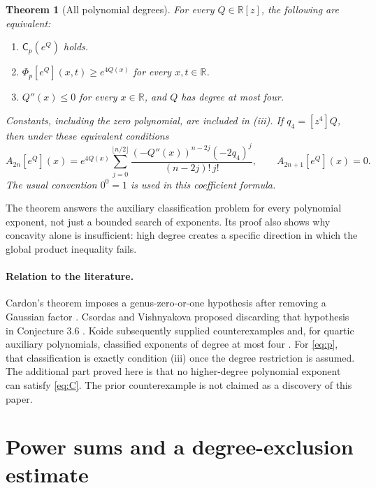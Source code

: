 \documentclass[11pt,a4paper]{article}
\newtheorem{theorem}{Theorem}[section]
\theoremstyle{remark}\newtheorem{remark}[theorem]{Remark}
\newcommand{\R}{\mathbb R}\newcommand{\C}{\mathbb C}
\newcommand{\Ph}{\Phi_p}
\begin{document}
\begin{theorem}[All polynomial degrees]\label{thm:main}
For every $Q\in\R[z]$, the following are equivalent:
\begin{enumerate}[label=\textup{(\roman*)},itemsep=3pt]
\item $\mathsf C_p(e^Q)$ holds.
\item $\Ph[e^Q](x,t)\ge e^{4Q(x)}$ for every $x,t\in\R$.
\item $Q''(x)\le0$ for every $x\in\R$, and $Q$ has degree at most four.
\end{enumerate}
Constants, including the zero polynomial, are included in \textup{(iii)}.
If $q_4=[z^4]Q$, then under these equivalent conditions
\begin{equation}\label{eq:coefficients}
 A_{2n}[e^Q](x)=e^{4Q(x)}
 \sum_{j=0}^{\lfloor n/2\rfloor}
 \frac{(-Q''(x))^{n-2j}(-2q_4)^j}{(n-2j)!\,j!},
 \qquad A_{2n+1}[e^Q](x)=0.
\end{equation}
The usual convention $0^0=1$ is used in this coefficient formula.
\end{theorem}

The theorem answers the auxiliary classification problem for every
polynomial exponent, not just a bounded search of exponents. Its proof
also shows why concavity alone is insufficient: high degree creates a
specific direction in which the global product inequality fails.

\paragraph{Relation to the literature.}
Cardon's theorem imposes a genus-zero-or-one hypothesis after removing
a Gaussian factor \cite{Cardon}. Csordas and Vishnyakova proposed
discarding that hypothesis in Conjecture 3.6 \cite[p.~1649]{CV}.
Koide subsequently supplied counterexamples and, for quartic auxiliary
polynomials, classified exponents of degree at most four
\cite[Section~5]{Koide}. For \eqref{eq:p}, that classification is exactly
condition \textup{(iii)} once the degree restriction is assumed.
The additional part proved here is that no higher-degree polynomial
exponent can satisfy \eqref{eq:C}. The prior counterexample is not
claimed as a discovery of this paper.

\section{Power sums and a degree-exclusion estimate}
\end{document}
